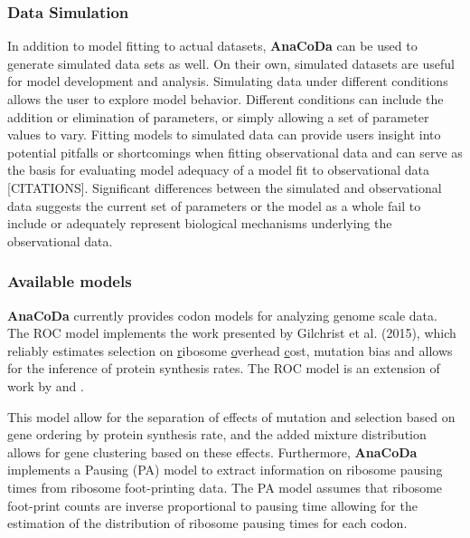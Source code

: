 \documentclass{bioinfo}
\newcommand{\package}{\textbf{AnaCoDa }} %
\begin{document}
\subsubsection*{Data Simulation}
In addition to model fitting to actual datasets, \package can be used to generate simulated data sets as well.
On their own, simulated datasets are useful for model development and analysis.
Simulating data under different conditions allows the user to explore model behavior. 
Different conditions can include the addition or elimination of parameters, or simply allowing a set of parameter values to vary.
Fitting models to simulated data can provide users insight into potential pitfalls or shortcomings when fitting observational data and can serve as the basis for evaluating model adequacy of a model fit to observational data [CITATIONS].
Significant differences between the simulated and observational data suggests the current set of parameters or the model as a whole fail to include or adequately represent biological mechanisms underlying the observational data.
 
\subsubsection*{Available models}
\package currently provides codon models for analyzing genome scale data.
The ROC model implements the work presented by Gilchrist et al. (2015), which reliably estimates selection on \underline{r}ibosome \underline{o}verhead \underline{c}ost, mutation bias and allows for the inference of protein synthesis rates. The ROC model is an extension of work by \citet{shah2011} and \citet{wallace2013}.
 
This model allow for the separation of effects of mutation and selection based on gene ordering by protein synthesis rate, and the added mixture distribution allows for gene clustering based on these effects.
Furthermore, \package implements a Pausing (PA) model to extract information on ribosome pausing times from ribosome foot-printing data. The PA model assumes that ribosome foot-print counts are inverse proportional to pausing time allowing for the estimation of the distribution of ribosome pausing times for each codon. 
\end{document}
